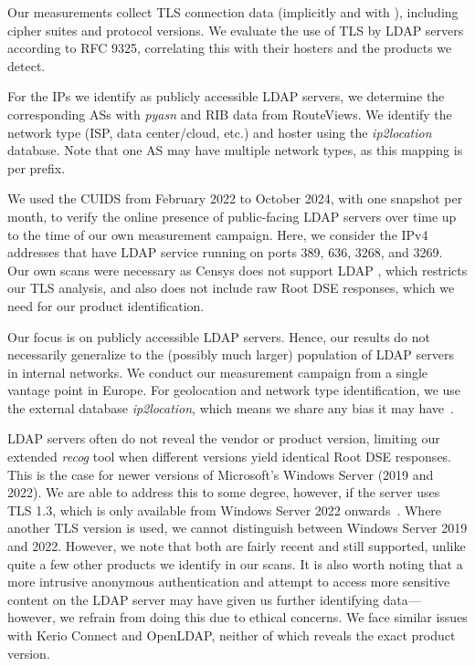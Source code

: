 Our measurements collect \gls{TLS} connection data (implicitly and with \starttls), including cipher suites and protocol versions. We evaluate the use of \gls{TLS} by \gls{LDAP} servers according to RFC 9325, correlating this with their hosters and the products we detect.

For the IPs we identify as publicly accessible \gls{LDAP} servers, we determine the corresponding \glspl{AS} with \textit{pyasn} and RIB data from RouteViews. We identify the network type (\gls{ISP}, data center/cloud, etc.) and hoster using the \textit{ip2location} database. Note that one AS may have multiple network types, as this mapping is per prefix.

We used the \gls{CUIDS} from February 2022 to October 2024, with one snapshot per month, to verify the online presence of public-facing \gls{LDAP} servers over time up to the time of our own measurement campaign. Here, we consider the IPv4 addresses that have \gls{LDAP} service running on ports 389, 636, 3268, and 3269.
Our own scans were necessary as Censys does not support \gls{LDAP} \starttls, which restricts our \gls{TLS} analysis, and also does not include raw Root DSE responses, which we need for our product identification.

\label{limitations}
Our focus is on publicly accessible \gls{LDAP} servers. Hence, our results do not necessarily generalize to the (possibly much larger) population of \gls{LDAP} servers in internal networks. We conduct our measurement campaign from a single vantage point in Europe.
For geolocation and network type identification, we use the external database \textit{ip2location}, which means we share any bias it may have~\cite{_IPGeolocationCapabilities_2024}.

\gls{LDAP} servers often do not reveal the vendor or product version, limiting our extended \textit{recog} tool when different versions yield identical Root \gls{DSE} responses. This is the case for newer versions of Microsoft's Windows Server (2019 and 2022). We are able to address this to some degree, however, if the server uses TLS 1.3, which is only available from Windows Server 2022 onwards~\cite{alvinashcraft_ProtocolsTLSSSL_2024}. Where another TLS version is used, we cannot distinguish between Windows Server 2019 and 2022. However, we note that both are fairly recent and still supported, unlike quite a few other products we identify in our scans. It is also worth noting that a more intrusive anonymous authentication and attempt to access more sensitive content on the \gls{LDAP} server may have given us further identifying data---however, we refrain from doing this due to ethical concerns. We face similar issues with Kerio Connect and OpenLDAP, neither of which reveals the exact product version.

